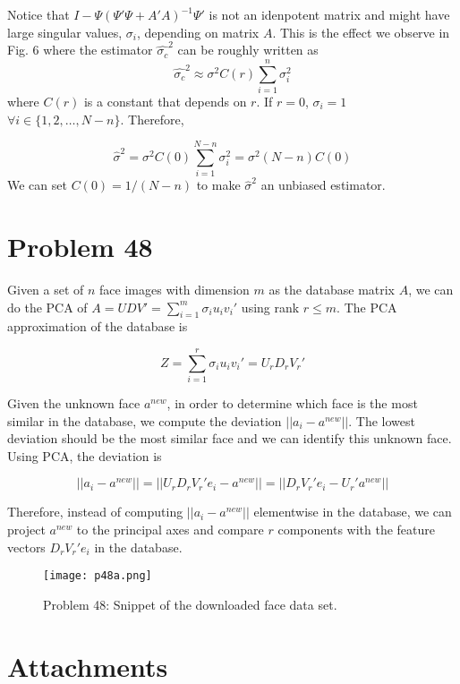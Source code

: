 \documentclass[a4paper, 11pt]{article}
\begin{document}
Notice that $I - \Psi\left(\Psi'\Psi + A'A \right)^{-1}\Psi'$ is not an idenpotent matrix and might have large singular values, $\sigma_i$, depending on matrix $A$. This is the effect we observe in Fig. 6 where the estimator $\hat{\sigma_c}^2$ can be roughly written as
\begin{equation}
\hat{\sigma_c}^2 \approx \sigma^2 C(r)\sum_{i=1}^n \sigma_i^2
\end{equation}
where $C(r)$ is a constant that depends on $r$. If $r = 0$, $\sigma_i = 1$ $\forall i \in \{1,2,\dots, N-n \}$. Therefore, 

\begin{equation}
\hat{\sigma}^2 = \sigma^2 C(0)\sum_{i=1}^{N-n} \sigma_i^2 = \sigma^2(N-n)C(0)
\end{equation}
We can set $C(0) = 1/(N-n)$ to make $\hat{\sigma}^2$ an unbiased estimator. 



\section*{Problem 48}


Given a set of $n$ face images with dimension $m$ as the database matrix $A$, we can do the PCA of $A = UDV' = \sum_{i=1}^m \sigma_iu_iv_i'$ using rank $r\leq m$. The PCA approximation of the database is 

\begin{equation}
Z = \sum_{i=1}^r \sigma_iu_iv_i' = U_rD_rV_r'
\end{equation}

Given the unknown face $a^{new}$, in order to determine which face is the most similar in the database, we compute the deviation $||a_i - a^{new}||$. The lowest deviation should be the most similar face and we can identify this unknown face. Using PCA, the deviation is

\begin{equation}
||a_i - a^{new}|| = ||U_rD_rV_r'e_i - a^{new}|| = ||D_rV_r'e_i - U_r'a^{new}||
\end{equation}

Therefore, instead of computing $||a_i - a^{new}||$ elementwise in the database, we can project $a^{new}$ to the principal axes and compare $r$ components with the feature vectors $D_rV_r'e_i$ in the database. 

\begin{figure}
	\begin{center}
		\texttt{[image: p48a.png]}
		\caption{Problem 48: Snippet of the downloaded face data set. }
	\end{center}
\end{figure}






\section*{Attachments}
	
\end{document}
